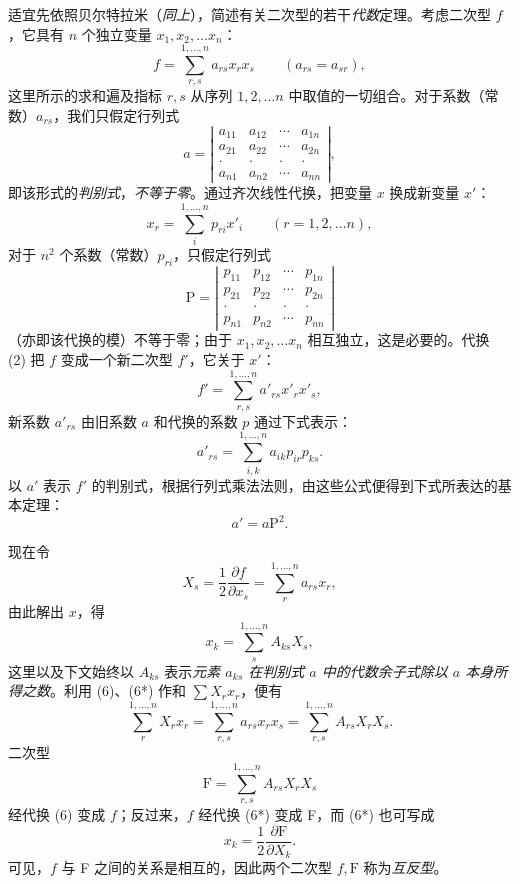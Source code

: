 适宜先依照贝尔特拉米（\emph{同上}），简述有关二次型的若干\emph{代数}定理。考虑二次型 \(f\)，它具有 \(n\) 个独立变量 \(x_1,x_2,\ldots x_n\)：
\begin{equation}\tag{1}
f=\sum_{r,s}^{1,\ldots,n}a_{rs}x_rx_s\qquad (a_{rs}=a_{sr}),
\end{equation}
这里所示的求和遍及指标 \(r,s\) 从序列 \(1,2,\ldots n\) 中取值的一切组合。对于系数（常数）\(a_{rs}\)，我们只假定行列式
\[
a=\left|\begin{matrix}
a_{11}&a_{12}&\cdots&a_{1n}\\
a_{21}&a_{22}&\cdots&a_{2n}\\
\cdot&\cdot&\cdot&\cdot\\
a_{n1}&a_{n2}&\cdots&a_{nn}
\end{matrix}\right|,
\]
即该形式的\emph{判别式}，\emph{不等于零}。通过齐次线性代换，把变量 \(x\) 换成新变量 \(x'\)：
\begin{equation}\tag{2}
x_r=\sum_i^{1,\ldots,n}p_{ri}x'_i\qquad (r=1,2,\ldots n),
\end{equation}
对于 \(n^2\) 个系数（常数）\(p_{ri}\)，只假定行列式
\[
\mathrm P=\left|\begin{matrix}
p_{11}&p_{12}&\cdots&p_{1n}\\
p_{21}&p_{22}&\cdots&p_{2n}\\
\cdot&\cdot&\cdot&\cdot\\
p_{n1}&p_{n2}&\cdots&p_{nn}
\end{matrix}\right|
\]
（亦即该代换的模）不等于零；由于 \(x_1,x_2,\ldots x_n\) 相互独立，这是必要的。代换 (2) 把 \(f\) 变成一个新二次型 \(f'\)，它关于 \(x'\)：
\begin{equation}\tag{3}
f'=\sum_{r,s}^{1,\ldots,n}a'_{rs}x'_rx'_s,
\end{equation}
新系数 \(a'_{rs}\) 由旧系数 \(a\) 和代换的系数 \(p\) 通过下式表示：
\begin{equation}\tag{4}
a'_{rs}=\sum_{i,k}^{1,\ldots,n}a_{ik}p_{ir}p_{ks}.
\end{equation}
以 \(a'\) 表示 \(f'\) 的判别式，根据行列式乘法法则，由这些公式便得到下式所表达的基本定理：
\begin{equation}\tag{5}
a'=a\mathrm P^2.
\end{equation}

现在令
\begin{equation}\tag{6}
X_s=\frac{1}{2}\frac{\partial f}{\partial x_s}=\sum_r^{1,\ldots,n}a_{rs}x_r,
\end{equation}
由此解出 \(x\)，得
\begin{equation}\tag{6*}
x_k=\sum_s^{1,\ldots,n}A_{ks}X_s,
\end{equation}
这里以及下文始终以 \(A_{ks}\) 表示\emph{元素 \(a_{ks}\) 在判别式 \(a\) 中的代数余子式除以 \(a\) 本身所得之数}。利用 (6)、(6*) 作和 \(\sum X_rx_r\)，便有
\[
\sum_r^{1,\ldots,n}X_rx_r
=\sum_{r,s}^{1,\ldots,n}a_{rs}x_rx_s
=\sum_{r,s}^{1,\ldots,n}A_{rs}X_rX_s.
\]
二次型
\begin{equation}\tag{7}
\mathrm F=\sum_{r,s}^{1,\ldots,n}A_{rs}X_rX_s
\end{equation}
经代换 (6) 变成 \(f\)；反过来，\(f\) 经代换 (6*) 变成 F，而 (6*) 也可写成
\[
x_k=\frac{1}{2}\frac{\partial \mathrm F}{\partial X_k}.
\]
可见，\(f\) 与 F 之间的关系是相互的，因此两个二次型 \(f,\mathrm F\) 称为\emph{互反型}。

